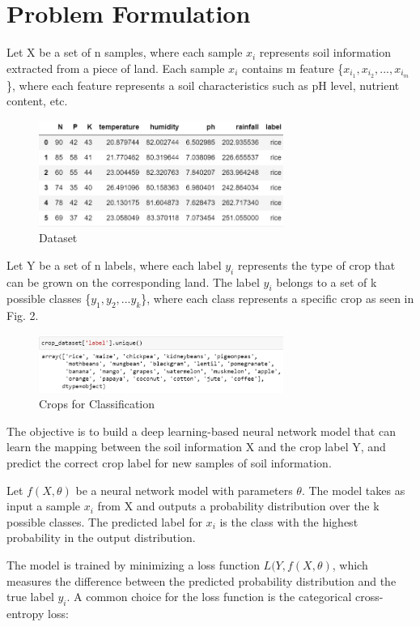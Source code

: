 \documentclass[conference]{IEEEtran}
\begin{document}
\section{Problem Formulation}
Let X be a set of n samples, where each sample $x_{i}$ represents soil information extracted from a piece of land. Each sample $x_{i}$ contains m feature \{$x_{i_1}, x_{i_2}, ..., x_{i_m}$\}, where each feature represents a soil characteristics such as pH level, nutrient content, etc.

\begin{figure}[h!]
    \centering
    \includegraphics[width = 8cm] {Dataset.png}
    \caption{Dataset}
    \label{fig:Dataset}
\end{figure}

Let Y be a set of n labels, where each label $y_{i}$ represents the type of crop that can be grown on the corresponding land. The label $y_{i}$ belongs to a set of k possible classes \{$y_{1}, y_{2}, ... y_{k}$\}, where each class represents a specific crop as seen in Fig. 2.

\begin{figure}[h!]
    \centering
    \includegraphics[width = 8cm] {labels.png}
    \caption{Crops for Classification}
    \label{fig:Crops for Classification}
\end{figure}

The objective is to build a deep learning-based neural network model that can learn the mapping between the soil information X and the crop label Y, and predict the correct crop label for new samples of soil information.

Let $f(X, \theta)$ be a neural network model with parameters $\theta$. The model takes as input a sample $x_{i}$ from X and outputs a probability distribution over the k possible classes. The predicted label for $x_i$ is the class with the highest probability in the output distribution.

The model is trained by minimizing a loss function $L(Y, f(X, \theta)$, which measures the difference between the predicted probability distribution and the true label $y_i$. A common choice for the loss function is the categorical cross-entropy loss:
\end{document}
